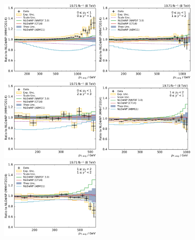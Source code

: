 \begin{figure}[htbp]
    \centering
    \includegraphics[width=0.45\textwidth]{figures/measurement/ratio_to_MMHT2014+np_totcomp_yb0ys0.pdf}\hfill
    \includegraphics[width=0.45\textwidth]{figures/measurement/ratio_to_MMHT2014+np_totcomp_yb0ys1.pdf}
    \includegraphics[width=0.45\textwidth]{figures/measurement/ratio_to_MMHT2014+np_totcomp_yb0ys2.pdf}\hfill
    \includegraphics[width=0.45\textwidth]{figures/measurement/ratio_to_MMHT2014+np_totcomp_yb1ys0.pdf}
    \includegraphics[width=0.45\textwidth]{figures/measurement/ratio_to_MMHT2014+np_totcomp_yb1ys1.pdf}\hfill

\end{figure}
